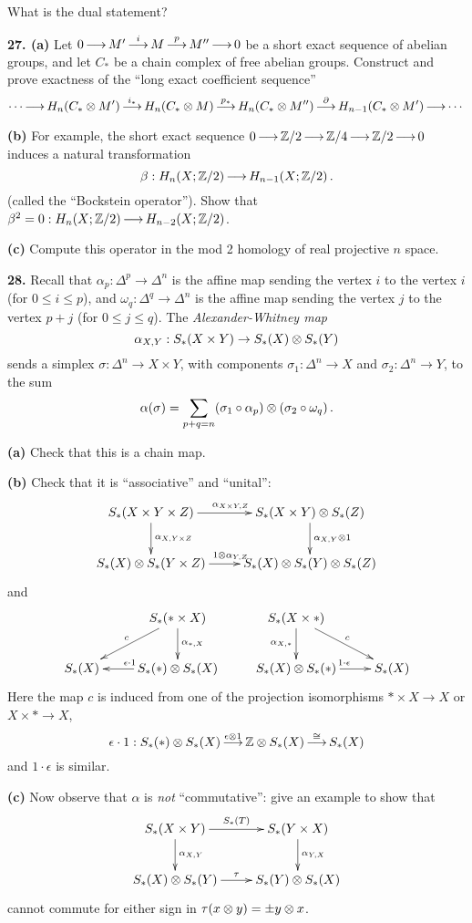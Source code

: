\documentclass[12pt]{article}
\begin{document}
What is the dual statement? 

\medskip
{\bf 27. (a)} Let $0\mathop{\longrightarrow}\limits^{}M'\mathop{\longrightarrow}\limits^{i}M\mathop{\longrightarrow}\limits^{p}M''\mathop{\longrightarrow}\limits^{}0$ be a short exact sequence
of abelian groups, and let $C_*$ be a chain complex of free abelian groups.
Construct and prove exactness of the ``long exact coefficient sequence'' 
\[
\cdots\mathop{\longrightarrow}\limits^{}H_n(C_*\otimes M')\mathop{\longrightarrow}\limits^{i_*}H_n(C_*\otimes M)\mathop{\longrightarrow}\limits^{p_*}
H_n(C_*\otimes M'')\mathop{\longrightarrow}\limits^{\partial}H_{n-1}(C_*\otimes M')\mathop{\longrightarrow}\limits^{}\cdots
\]

{\bf(b)} For example, the short exact sequence 
$0\mathop{\longrightarrow}\limits^{}\mathbb Z/2\mathop{\longrightarrow}\limits^{}\mathbb Z/4\mathop{\longrightarrow}\limits^{}\mathbb Z/2\mathop{\longrightarrow}\limits^{}0$ induces a natural transformation
\[
\beta:H_n(X;\mathbb Z/2)\mathop{\longrightarrow}\limits^{}H_{n-1}(X;\mathbb Z/2)\,.
\]
(called the ``Bockstein operator'').
Show that $\beta^2=0:H_n(X;\mathbb Z/2)\mathop{\longrightarrow}\limits^{}H_{n-2}(X;\mathbb Z/2)$.

{\bf (c)} 
Compute this operator in the mod 2 homology of real projective $n$ space.


\medskip
{\bf 28.} 
Recall that $\alpha_p:\Delta^p\to\Delta^n$ is the affine map sending the vertex
$i$ to the vertex $i$ (for $0\leq i\leq p$), and 
$\omega_q:\Delta^q\to\Delta^n$ is the affine map sending the vertex
$j$ to the vertex $p+j$ (for $0\leq j\leq q$). The {\em Alexander-Whitney map}
\[
\alpha_{X,Y}:S_*(X\times Y)\to S_*(X)\otimes S_*(Y)
\]
sends a simplex $\sigma:\Delta^n\to X\times Y$, with components
$\sigma_1:\Delta^n\to X$ and $\sigma_2:\Delta^n\to Y$, to the sum
\[
\alpha(\sigma)=
\sum_{p+q=n}(\sigma_1\circ\alpha_p)\otimes(\sigma_2\circ\omega_q)\,.
\]

{\bf (a)} Check that this is a chain map. 

{\bf (b)} Check that it is ``associative'' and ``unital'':
\[
\xymatrix{
S_*(X\times Y\times Z) \ar[r]^{\alpha_{X\times Y,Z}} 
\ar[d]^{\alpha_{X,Y\times Z}} & 
S_*(X\times Y)\tensor S_*(Z) \ar[d]^{\alpha_{X,Y}\tensor1} \\
S_*(X)\tensor S_*(Y\times Z) \ar[r]^{1\tensor\alpha_{Y,Z}} &
S_*(X)\tensor S_*(Y)\tensor S_*(Z)
}\]
and
\[
\xymatrix{
& S_*(*\times X) \ar[dl]_c \ar[d]^{\alpha_{*,X}} & 
S_*(X\times *) \ar[dr]^c \ar[d]_{\alpha_{X,*}} \\
S_*(X) & S_*(*)\tensor S_*(X) \ar[l]_{\epsilon\cdot1} & 
S_*(X)\tensor S_*(*) \ar[r]^{1\cdot\epsilon} & S_*(X)
}\]
Here the map $c$ is induced from one of the projection isomorphisms
$*\times X\to X$ or $X\times*\to X$, 
\[
\epsilon\cdot1:S_*(*)\otimes S_*(X)\mathop{\longrightarrow}\limits^{\epsilon\otimes1}\mathbb Z\otimes S_*(X)
\mathop{\longrightarrow}\limits^{\cong}S_*(X)
\]
and $1\cdot\epsilon$ is similar.

{\bf(c)} Now observe that $\alpha$ is {\em not} ``commutative'': give an
example to show that 
\[
\xymatrix{
S_*(X\times Y) \ar[r]^{S_*(T)} \ar[d]^{\alpha_{X,Y}} & 
S_*(Y\times X) \ar[d]^{\alpha_{Y,X}} \\
S_*(X)\tensor S_*(Y) \ar[r]^{\tau} & S_*(Y)\tensor S_*(X)
}\]
cannot commute for either sign in $\tau(x\otimes y)=\pm y\otimes x$. 
\end{document}
